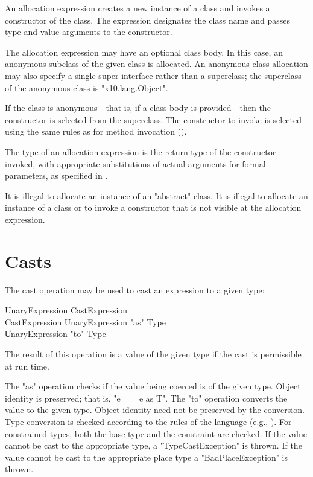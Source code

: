 An allocation expression creates a new instance of a class and
invokes a constructor of the class.
The expression designates the class name and passes
type and value arguments to the constructor.

The allocation expression may have an optional class body.
In this case, an anonymous subclass of the given class is
allocated.   An anonymous class allocation may also specify a
single super-interface rather than a superclass; the superclass
of the anonymous class is \xcd"x10.lang.Object".

If the class is anonymous---that is, if a class body is
provided---then the constructor is selected from the superclass.
The constructor to invoke is selected using the same rules as
for method invocation ().

The type of an allocation expression
is the return type of the constructor invoked, with appropriate
substitutions  of actual arguments for formal parameters, as
specified in .

It is illegal to allocate an instance of an \xcd"abstract" class.
It is illegal to allocate an instance of a class or to invoke a
constructor that is not visible at
the allocation expression.


\section{Casts}\label{ClassCast}

The cast operation may be used to cast an expression to a given type:

\begin{grammar}
UnaryExpression \: CastExpression \\
CastExpression \: UnaryExpression \xcd"as" Type \\
\| UnaryExpression \xcd"to" Type \\
\end{grammar}

The result of this operation is a value of the given type if the cast
is permissible at run time.

The \xcd"as" operation checks if the value being coerced is of
the given type.  Object identity is preserved; that is,
\xcd"e == e as T".
The \xcd"to" operation converts the value to the given type. 
Object identity need not be preserved by the conversion.
Type conversion is checked according to the
rules of the \java{} language (e.g., \cite[\S 5.5]{jls2}).
For constrained types, both the base
type and the constraint are checked.
If the
value cannot be cast to the appropriate type, a
\xcd"TypeCastException"
is thrown. If the value cannot be cast to the
appropriate place type a \xcd"BadPlaceException" is thrown. 

